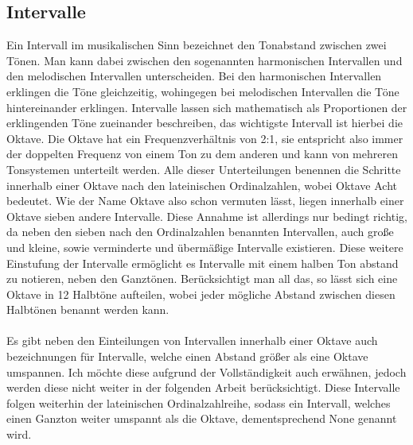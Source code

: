 \subsection{Intervalle}
\label{sec:Intervalle}
Ein Intervall im musikalischen Sinn bezeichnet den Tonabstand zwischen zwei Tönen. Man kann dabei zwischen den sogenannten harmonischen Intervallen und den melodischen Intervallen unterscheiden. Bei den harmonischen Intervallen erklingen die Töne
gleichzeitig, wohingegen bei melodischen Intervallen die Töne hintereinander erklingen. Intervalle lassen sich mathematisch als Proportionen der erklingenden Töne zueinander beschreiben, das wichtigste Intervall ist hierbei die Oktave. Die Oktave hat ein Frequenzverhältnis von 2:1, 
sie entspricht also immer der doppelten Frequenz von einem Ton zu dem anderen und kann von mehreren Tonsystemen unterteilt werden. Alle dieser Unterteilungen benennen die Schritte innerhalb einer 
Oktave nach den lateinischen Ordinalzahlen, wobei Oktave Acht bedeutet. Wie der Name Oktave also schon vermuten lässt, liegen innerhalb einer Oktave sieben andere Intervalle. Diese Annahme ist allerdings nur bedingt richtig, da neben den sieben nach den Ordinalzahlen benannten Intervallen, auch 
große und kleine, sowie verminderte und übermäßige Intervalle existieren. Diese weitere Einstufung der Intervalle ermöglicht es Intervalle mit einem halben Ton abstand zu notieren, neben den Ganztönen. Berücksichtigt man all das, so lässt sich eine Oktave in 
12 Halbtöne aufteilen, wobei jeder mögliche Abstand zwischen diesen Halbtönen benannt werden kann. \\\\
Es gibt neben den Einteilungen von Intervallen innerhalb einer Oktave auch bezeichnungen für Intervalle, welche einen Abstand größer als eine Oktave umspannen. Ich möchte diese aufgrund der Vollständigkeit auch erwähnen, jedoch werden diese nicht weiter in der folgenden Arbeit berücksichtigt.
Diese Intervalle folgen weiterhin der lateinischen Ordinalzahlreihe, sodass ein Intervall, welches einen Ganzton weiter umspannt als die Oktave, dementsprechend None genannt wird. \cite{abcmusik}

